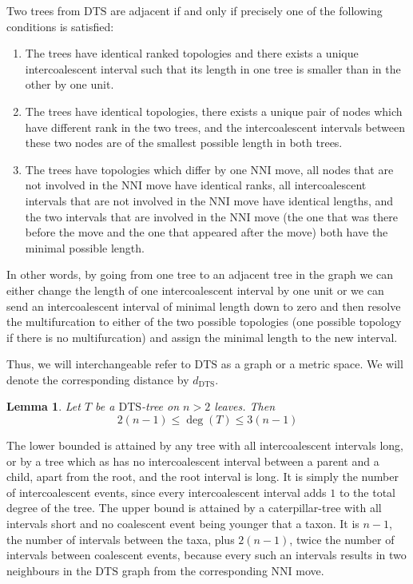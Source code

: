\documentclass{amsart}
\newtheorem{lemma}{Lemma}
\newcommand{\dts}{\mathrm{DTS}}
\begin{document}
Two trees from $\dts$ are adjacent if and only if precisely one of the following
conditions is satisfied: 

\begin{enumerate}[(1)]
\item The trees have identical ranked topologies and there exists a unique
intercoalescent interval such that its length in one tree is smaller than in the
other by one unit. 
\item The trees have identical topologies, there exists a unique pair of nodes
which have different rank in the two trees, and the intercoalescent intervals 
between these two nodes are of the smallest possible length in both trees. 
\item The trees have topologies which differ by one NNI move, all nodes that
are not involved in the NNI move have identical ranks, all intercoalescent
intervals that are not involved in the NNI move have identical lengths, 
and the two intervals that are involved in the NNI move (the one that was there
before the move and the one that appeared after the move) both have the minimal
possible length.  
\end{enumerate}

In other words, by going from one tree to an adjacent tree in the graph we can
either change the length of one intercoalescent interval by one unit or we
can send an intercoalescent interval of minimal length down to zero and
then resolve the multifurcation to either of the two possible topologies
(one possible topology if there is no multifurcation) and
assign the minimal length to the new interval.

Thus, we will interchangeable refer to $\dts$ as a graph or a metric space. 
We will denote the corresponding distance by $d_\dts$. 

\begin{lemma}
Let $T$ be a $\dts$-tree on $n>2$ leaves. Then \[2(n-1)\leq \deg(T)\leq3(n-1)\] 
\end{lemma}

\proof
The lower bounded is attained by any tree with all intercoalescent intervals 
long, or by a tree which as has no intercoalescent interval between a parent and
a child, apart from the root, and the root interval is long. It is simply the
number of intercoalescent events, since every intercoalescent interval adds $1$
to the total degree of the tree. The upper bound is attained by a 
caterpillar-tree with all intervals short and no coalescent event being younger
that a taxon. It is $n-1$, the number of intervals between the taxa, plus 
$2(n-1)$, twice the number of intervals between coalescent events, because 
every such an intervals results in two neighbours in the $\dts$ graph from
the corresponding NNI move. 
\endproof
\end{document}
